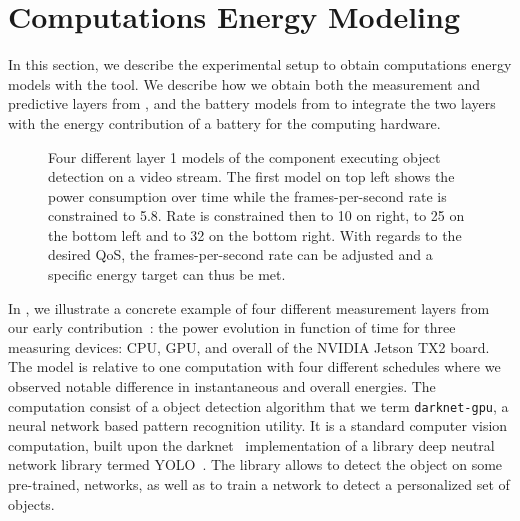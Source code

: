 \section{Computations Energy Modeling}
\label{sec:res-ene-comps}

In this section, we describe the experimental setup to obtain computations energy models with the \powprof tool. We describe how we obtain both the measurement and predictive layers from , and the battery models from  to integrate the two layers with the energy contribution of a battery for the computing hardware.

\begin{figure}[h!]
  \begin{minipage}{.93\textwidth}
  \centering
  \selectfont
  \hspace*{20ex}
  
  \caption{Four different layer 1 models of the  component executing object detection on a video stream. The first model on top left shows the power consumption over time while the frames-per-second rate is constrained to 5.8. Rate is constrained then to 10 on right, to 25 on the bottom left and to 32 on the bottom right. With regards to the desired QoS, the frames-per-second rate can be adjusted and a specific energy target can thus be met.} 
  \label{fig:darknet-layer1}
  \end{minipage}
\end{figure}
In , we illustrate a concrete example of four different measurement layers from our early contribution~\citep{seewald2019coarse}: the power evolution in function of time for three measuring devices: CPU, GPU, and overall of the NVIDIA Jetson TX2 board. The model is relative to one computation with four different schedules where we observed notable difference in instantaneous and overall energies. The computation consist of a object detection algorithm that we term {\small\tt darknet-gpu}, a neural network based pattern recognition utility. It is a standard computer vision computation, built upon the darknet~\citep{redmond2017yolo,redomnd2013darknet} implementation of a library deep neutral network library termed YOLO~\citep{redmon2016you}. The library allows to detect the object on some pre-trained, networks, as well as to train a network to detect a personalized set of objects.

